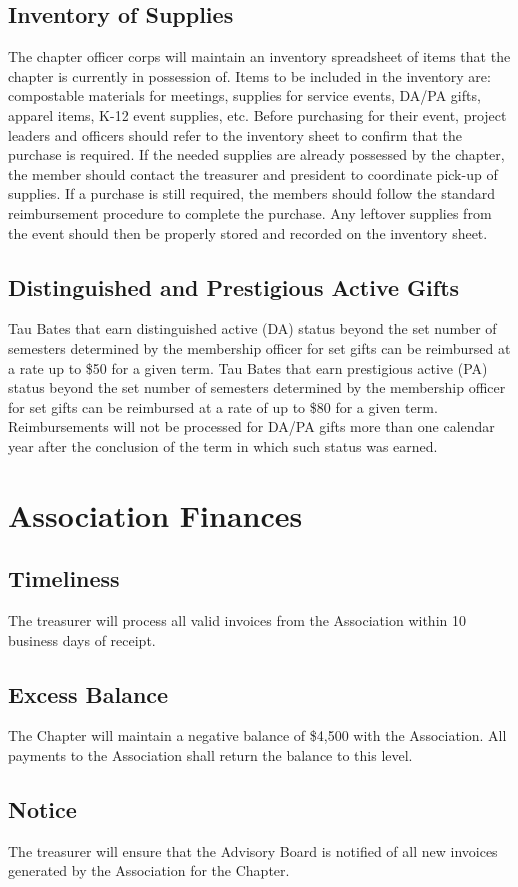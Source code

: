 \documentclass[bylaws,final,10pt,withoutoptional,withoutpreface,officerdoc]{../bylaws}
\begin{document}
\section{Inventory of Supplies} The chapter officer corps will maintain an inventory spreadsheet of items that the chapter is currently in possession of. Items to be included in the inventory are: compostable materials for meetings, supplies for service events, DA/PA gifts, apparel items, K-12 event supplies, etc. Before purchasing for their event, project leaders and officers should refer to the inventory sheet to confirm that the purchase is required. If the needed supplies are already possessed by the chapter, the member should contact the treasurer and president to coordinate pick-up of supplies. If a purchase is still required, the members should follow the standard reimbursement procedure to complete the purchase. Any leftover supplies from the event should then be properly stored and recorded on the inventory sheet.

\section{Distinguished and Prestigious Active Gifts} Tau Bates that earn distinguished active (DA) status beyond the set number of semesters determined by the membership officer for set gifts can be reimbursed at a rate up to \$50 for a given term. Tau Bates that earn prestigious active (PA) status beyond the set number of semesters determined by the membership officer for set gifts can be reimbursed at a rate of up to \$80 for a given term. Reimbursements will not be processed for DA/PA gifts more than one calendar year after the conclusion of the term in which such status was earned.   

\chapter{Association Finances}
\section{Timeliness} The treasurer will process all valid invoices from the Association within 10 business days of receipt.

\section{Excess Balance} The Chapter will maintain a negative balance of \$4,500 with the Association. All payments to the Association shall return the balance to this level.

\section{Notice} The treasurer will ensure that the Advisory Board is notified of all new invoices generated by the Association for the Chapter.
\end{document}
